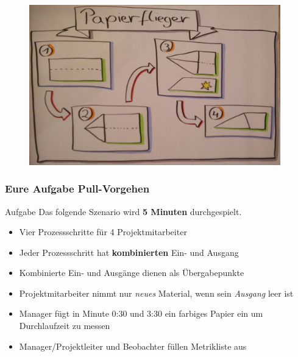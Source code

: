 \begin{frame}
	\begin{figure}[ht]
		\includegraphics[width=10.9cm]{Bilder/papierflieger.jpg}
	\end{figure}
\end{frame}
\begin{frame}
	\frametitle{Eure Aufgabe Pull-Vorgehen}
	\begin{exampleblock}{Aufgabe}
		Das folgende Szenario wird \textbf{5 Minuten} durchgespielt.
	\end{exampleblock}
	\begin{itemize}[<+->]
		\item Vier Prozessschritte für 4 Projektmitarbeiter
		\item Jeder Prozessschritt hat \textbf{kombinierten} Ein- und Ausgang
		\item Kombinierte Ein- und Ausgänge dienen als Übergabepunkte
		\item Projektmitarbeiter nimmt nur \emph{neues} Material, wenn sein \emph{Ausgang} leer ist
		\item Manager fügt in Minute 0:30 und 3:30 ein farbiges Papier ein um Durchlaufzeit zu messen
		\item  Manager/Projektleiter und Beobachter füllen Metrikliste aus
	\end{itemize}
\end{frame}

